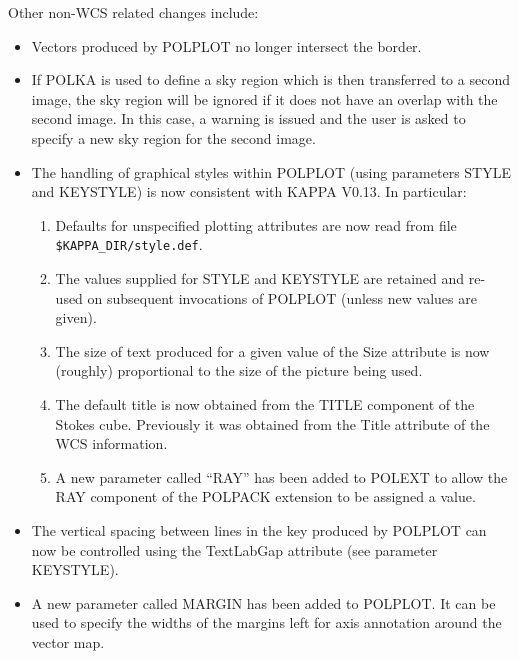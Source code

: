 \documentclass[twoside,11pt]{starlink}
\begin{document}
Other non-WCS related changes include:
\begin{itemize}
\item Vectors produced by POLPLOT no longer intersect the border.
\item If POLKA is used to define a sky region which is then transferred to
a second image, the sky region will be ignored if it does not have an overlap
with the second image. In this case, a warning is issued and the user is
asked to specify a new sky region for the second image.
\item The handling of graphical styles within POLPLOT (using parameters
STYLE and KEYSTYLE) is now consistent with KAPPA V0.13. In particular:
\begin{enumerate}
\item Defaults for unspecified plotting attributes are now read from file
\verb+$KAPPA_DIR/style.def+.
\item The values supplied for STYLE and KEYSTYLE are retained and re-used
on subsequent invocations of POLPLOT (unless new values are given).
\item The size of text produced for a given value of the Size attribute is
now (roughly) proportional to the size of the picture being used.
\item The default title is now obtained from the TITLE component of
the Stokes cube. Previously it was obtained from the Title attribute of
the WCS information.
\item A new parameter called ``RAY'' has been added to POLEXT to allow the RAY
component of the POLPACK extension to be assigned a value.
\end{enumerate}
\item The vertical spacing between lines in the key produced by POLPLOT can
now be controlled using the TextLabGap attribute (see parameter KEYSTYLE).
\item A new parameter called MARGIN has been added to POLPLOT. It can be
used to specify the widths of the margins left for axis annotation around
the vector map.
\end{itemize}
\end{document}
